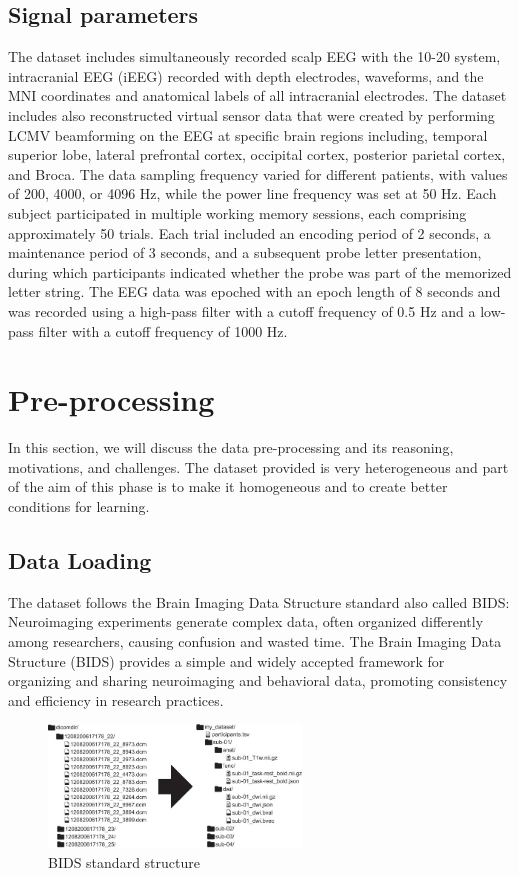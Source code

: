 \documentclass{article}
\begin{document}
\subsection{Signal parameters}
The dataset includes simultaneously recorded scalp EEG with the 10-20 system, intracranial EEG (iEEG) recorded with depth electrodes, waveforms, and the MNI coordinates and anatomical labels of all intracranial electrodes. The dataset includes also reconstructed virtual sensor data that were created by performing LCMV beamforming on the EEG at specific brain regions including, temporal superior lobe, lateral prefrontal cortex, occipital cortex, posterior parietal cortex, and Broca. The data sampling frequency varied for different patients, with values of 200, 4000, or 4096 Hz, while the power line frequency was set at 50 Hz. Each subject participated in multiple working memory sessions, each comprising approximately 50 trials. Each trial included an encoding period of 2 seconds, a maintenance period of 3 seconds, and a subsequent probe letter presentation, during which participants indicated whether the probe was part of the memorized letter string. The EEG data was epoched with an epoch length of 8 seconds and was recorded using a high-pass filter with a cutoff frequency of 0.5 Hz and a low-pass filter with a cutoff frequency of 1000 Hz. 


    

\section{Pre-processing}
In this section, we will discuss the data pre-processing and its reasoning, motivations, and challenges. The dataset provided is very heterogeneous and part of the aim of this phase is to make it homogeneous and to create better conditions for learning.

\subsection{Data Loading}
The dataset follows the Brain Imaging Data Structure standard also called BIDS: Neuroimaging experiments generate complex data, often organized differently among researchers, causing confusion and wasted time. The Brain Imaging Data Structure (BIDS) provides a simple and widely accepted framework for organizing and sharing neuroimaging and behavioral data, promoting consistency and efficiency in research practices.

\begin{figure}[h]
  \centering
  \includegraphics[width=0.6\textwidth]{img/bids_nature.jpg}
  \caption{BIDS standard structure}
  \label{fig:BIDS}
\end{figure}
\end{document}
